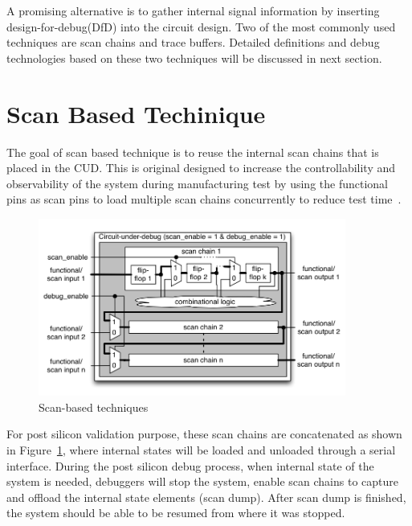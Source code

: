 \documentclass[12pt,frontmatter,copyright,thesis]{usfmanus}
\begin{document}
A promising alternative is to gather internal signal information
by inserting
 design-for-debug(DfD) into
the circuit design.
Two of the most commonly used techniques are scan chains 
and trace buffers. Detailed definitions and 
debug technologies based on these two techniques will be discussed
in next section.

\section{Scan Based Techinique}
The goal of scan based technique is to
reuse the internal scan chains that is
placed in the CUD.
This is original designed to increase
the controllability and observability of the system
during manufacturing test by using the functional pins as scan pins to load 
multiple scan chains concurrently to reduce test time~\cite{nicolici2009design}.


\begin{figure}[h]
\centering
\includegraphics[width=0.9\textwidth]{scanchains.png}
\caption{Scan-based techniques~\cite{nicolici2009design}}
\label{sss}
\end{figure}
For post silicon validation purpose, these
scan chains are concatenated as shown in Figure~\ref{sss},
where internal states will be loaded and unloaded through
a serial interface.
During the post silicon debug process, 
when internal state of the system is needed,
debuggers will stop the system, enable scan chains to capture 
and offload the
internal state elements (scan dump). 
After scan dump is finished, the system should be able
to be resumed from where it was stopped.
\end{document}
